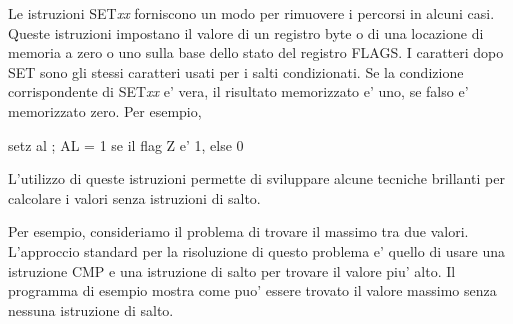 Le istruzioni {\code SET\emph{xx}} forniscono un
modo per rimuovere i percorsi in alcuni casi. Queste istruzioni impostano
il valore di un registro byte o di una locazione di memoria a zero o uno 
sulla base dello stato del registro FLAGS. I caratteri dopo {\code SET}
sono gli stessi caratteri usati per i salti condizionati. Se la 
condizione corrispondente di {\code SET\emph{xx}} e' vera, il risultato
memorizzato e' uno, se falso e' memorizzato zero. Per esempio,
\begin{AsmCodeListing}[frame=none,numbers=none]
      setz   al        ; AL = 1 se il flag Z e' 1, else 0
\end{AsmCodeListing}
L'utilizzo di queste istruzioni permette di sviluppare alcune tecniche
brillanti per calcolare i valori senza istruzioni di salto.

Per esempio, consideriamo il problema di trovare il massimo tra due
valori. L'approccio standard per la risoluzione di questo problema e'
quello di usare una istruzione {\code CMP} e una istruzione di salto 
per trovare il valore piu' alto. Il programma di esempio mostra come puo'
essere trovato il valore massimo senza nessuna istruzione di salto.

